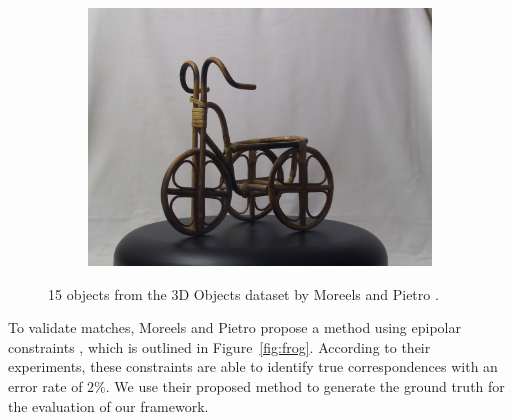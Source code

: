 \documentclass[review]{elsarticle}
\begin{document}
\begin{figure}[htb]
\begin{subfigure}[t]{0.15\columnwidth}
        \includegraphics[width=1\columnwidth]{images/3d/15}
    \end{subfigure}%
    \vspace{1.5 mm}

    \caption{15 objects from the 3D Objects dataset by Moreels
    and Pietro \cite{moreels2007evaluation}.}
    \label{fig:3d_objects}
\end{figure}


To validate matches, Moreels and Pietro propose a method using epipolar constraints \cite[p.266]{moreels2007evaluation}, which is outlined in Figure~\ref{fig:frog}.  According to their experiments, these constraints are able to identify true correspondences with an error rate of $2\%$. We use their proposed method to generate the ground truth for the evaluation of our framework.
\end{document}
